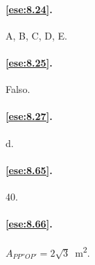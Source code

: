 \paragraph{\ref{ese:8.24}.}
A, B, C, D, E.

\paragraph{\ref{ese:8.25}.}
Falso.

\paragraph{\ref{ese:8.27}.}
d.

\paragraph{\ref{ese:8.65}.}
40.

\paragraph{\ref{ese:8.66}.}
$A_{PP''OP'}=2\sqrt{3}$~m\textsuperscript{2}.

\endgroup
